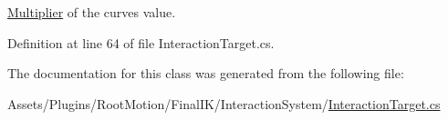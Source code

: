 \mbox{\hyperlink{class_root_motion_1_1_final_i_k_1_1_interaction_target_1_1_multiplier}{Multiplier}} of the curve\textquotesingle{}s value. 



Definition at line 64 of file Interaction\+Target.\+cs.



The documentation for this class was generated from the following file\+:\begin{DoxyCompactItemize}
\item 
Assets/\+Plugins/\+Root\+Motion/\+Final\+I\+K/\+Interaction\+System/\mbox{\hyperlink{_interaction_target_8cs}{Interaction\+Target.\+cs}}\end{DoxyCompactItemize}
